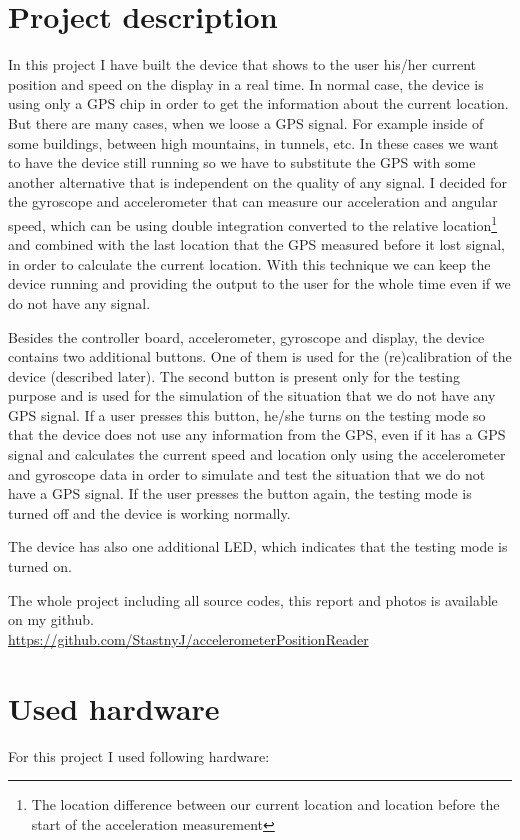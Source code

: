 \documentclass[hidelinks,a4paper]{article}
\begin{document}
\section{Project description}
In this project I have built the device that shows to the user his/her current position and speed on the display in a real time. In normal case, the device is using only a GPS chip in order to get the information about the current location. But there are many cases, when we loose a GPS signal. For example inside of some buildings, between high mountains, in tunnels, etc. In these cases we want to have the device still running so we have to substitute the GPS with some another alternative that is independent on the quality of any signal. I decided for the gyroscope and accelerometer that can measure our acceleration and angular speed, which can be using double integration converted to the relative location\footnote{The location difference between our current location and location before the start of the acceleration measurement} and combined with the last location that the GPS measured before it lost signal, in order to calculate the current location. With this technique we can keep the device running and providing the output to the user for the whole time even if we do not have any signal.\par
Besides the controller board, accelerometer, gyroscope and display, the device contains two additional buttons. One of them is used for the (re)calibration of the device (described later). The second button is present only for the testing purpose and is used for the simulation of the situation that we do not have any GPS signal. If a user presses this button, he/she turns on the testing mode so that the device does not use any information from the GPS, even if it has a GPS signal and calculates the current speed and location only using the accelerometer and gyroscope data in order to simulate and test the situation that we do not have a GPS signal. If the user presses the button again, the testing mode is turned off and the device is working normally.\par
The device has also one additional LED, which indicates that the testing mode is turned on.\\\par
The whole project including all source codes, this report and photos is available on my github.\\
\url{https://github.com/StastnyJ/accelerometerPositionReader}

\section{Used hardware}
For this project I used following hardware:
\end{document}
